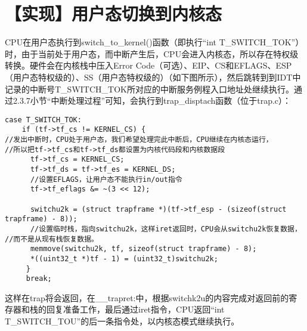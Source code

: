 \section{【实现】用户态切换到内核态}\label{ux5b9eux73b0ux7528ux6237ux6001ux5207ux6362ux5230ux5185ux6838ux6001}

CPU在用户态执行到switch\_to\_kernel()函数（即执行``int
T\_SWITCH\_TOK''）时，由于当前处于用户态，而中断产生后，CPU会进入内核态，所以存在特权级转换。硬件会在内核栈中压入Error
Code（可选）、EIP、CS和EFLAGS、ESP（用户态特权级的）、SS（用户态特权级的）（如下图所示），然后跳转到到IDT中记录的中断号T\_SWITCH\_TOK所对应的中断服务例程入口地址处继续执行。通过2.3.7小节``中断处理过程''可知，会执行到trap\_disptach函数（位于trap.c）：

\begin{lstlisting}
case T_SWITCH_TOK:
    if (tf->tf_cs != KERNEL_CS) {
//发出中断时，CPU处于用户态，我们希望处理完此中断后，CPU继续在内核态运行，
//所以把tf->tf_cs和tf->tf_ds都设置为内核代码段和内核数据段
      tf->tf_cs = KERNEL_CS;
      tf->tf_ds = tf->tf_es = KERNEL_DS;
      //设置EFLAGS，让用户态不能执行in/out指令
      tf->tf_eflags &= ~(3 << 12);

      switchu2k = (struct trapframe *)(tf->tf_esp - (sizeof(struct trapframe) - 8));
      //设置临时栈，指向switchu2k，这样iret返回时，CPU会从switchu2k恢复数据，
//而不是从现有栈恢复数据。
      memmove(switchu2k, tf, sizeof(struct trapframe) - 8);
      *((uint32_t *)tf - 1) = (uint32_t)switchu2k;
     }
     break;
\end{lstlisting}

这样在trap将会返回，在\_\_trapret:中，根据switchk2u的内容完成对返回前的寄存器和栈的回复准备工作，最后通过iret指令，CPU返回``int
T\_SWITCH\_TOU''的后一条指令处，以内核态模式继续执行。
